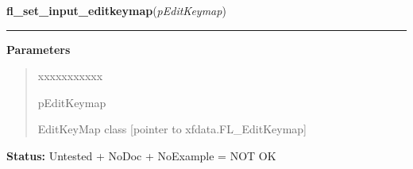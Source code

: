\hspace{.8\funcindent}\begin{boxedminipage}{\funcwidth}

    \raggedright \textbf{fl\_set\_input\_editkeymap}(\textit{pEditKeymap})

    \vspace{-1.5ex}

    \rule{\textwidth}{0.5\fboxrule}
\setlength{\parskip}{2ex}
\setlength{\parskip}{1ex}
      \textbf{Parameters}
      \vspace{-1ex}

      \begin{quote}
        \begin{Ventry}{xxxxxxxxxxx}

          \item[pEditKeymap]

          EditKeyMap class [pointer to xfdata.FL\_EditKeymap]

        \end{Ventry}

      \end{quote}

\textbf{Status:} Untested + NoDoc + NoExample = NOT OK



    \end{boxedminipage}

    \label{xformslib:library:fl_add_nmenu}

    \vspace{0.5ex}

